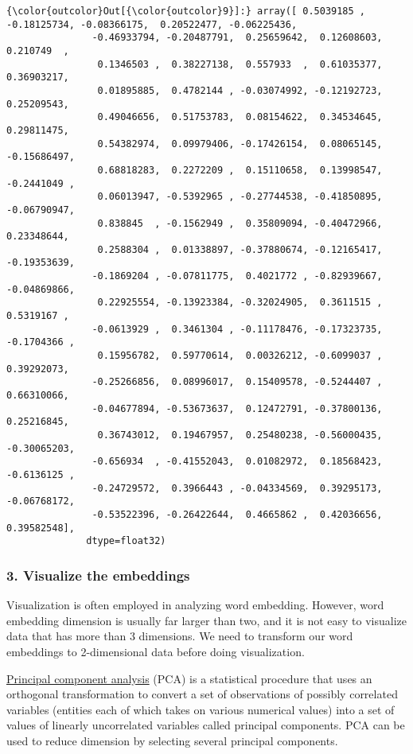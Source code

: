 \documentclass[11pt]{article}
\begin{document}
\begin{Verbatim}[commandchars=\\\{\}]
{\color{outcolor}Out[{\color{outcolor}9}]:} array([ 0.5039185 , -0.18125734, -0.08366175,  0.20522477, -0.06225436,
               -0.46933794, -0.20487791,  0.25659642,  0.12608603,  0.210749  ,
                0.1346503 ,  0.38227138,  0.557933  ,  0.61035377,  0.36903217,
                0.01895885,  0.4782144 , -0.03074992, -0.12192723,  0.25209543,
                0.49046656,  0.51753783,  0.08154622,  0.34534645,  0.29811475,
                0.54382974,  0.09979406, -0.17426154,  0.08065145, -0.15686497,
                0.68818283,  0.2272209 ,  0.15110658,  0.13998547, -0.2441049 ,
                0.06013947, -0.5392965 , -0.27744538, -0.41850895, -0.06790947,
                0.838845  , -0.1562949 ,  0.35809094, -0.40472966,  0.23348644,
                0.2588304 ,  0.01338897, -0.37880674, -0.12165417, -0.19353639,
               -0.1869204 , -0.07811775,  0.4021772 , -0.82939667, -0.04869866,
                0.22925554, -0.13923384, -0.32024905,  0.3611515 ,  0.5319167 ,
               -0.0613929 ,  0.3461304 , -0.11178476, -0.17323735, -0.1704366 ,
                0.15956782,  0.59770614,  0.00326212, -0.6099037 ,  0.39292073,
               -0.25266856,  0.08996017,  0.15409578, -0.5244407 ,  0.66310066,
               -0.04677894, -0.53673637,  0.12472791, -0.37800136,  0.25216845,
                0.36743012,  0.19467957,  0.25480238, -0.56000435, -0.30065203,
               -0.656934  , -0.41552043,  0.01082972,  0.18568423, -0.6136125 ,
               -0.24729572,  0.3966443 , -0.04334569,  0.39295173, -0.06768172,
               -0.53522396, -0.26422644,  0.4665862 ,  0.42036656,  0.39582548],
              dtype=float32)
\end{Verbatim}
            
    \hypertarget{visualize-the-embeddings}{%
\subsubsection{3. Visualize the
embeddings}\label{visualize-the-embeddings}}

Visualization is often employed in analyzing word embedding. However,
word embedding dimension is usually far larger than two, and it is not
easy to visualize data that has more than 3 dimensions. We need to
transform our word embeddings to 2-dimensional data before doing
visualization.

\href{https://en.wikipedia.org/wiki/Principal_component_analysis}{Principal
component analysis} (PCA) is a statistical procedure that uses an
orthogonal transformation to convert a set of observations of possibly
correlated variables (entities each of which takes on various numerical
values) into a set of values of linearly uncorrelated variables called
principal components. PCA can be used to reduce dimension by selecting
several principal components.
\end{document}
